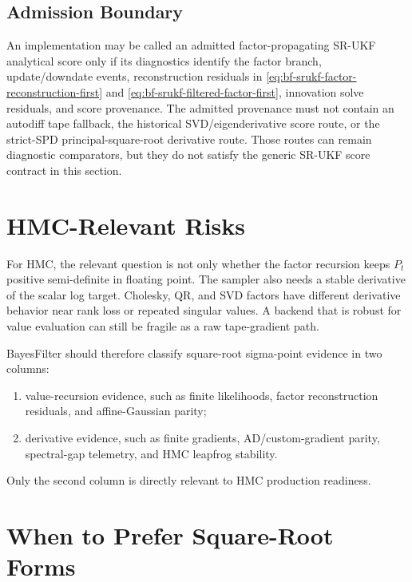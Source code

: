 \subsection{Admission Boundary}
\label{sec:bf-srukf-admission-boundary}

An implementation may be called an admitted factor-propagating SR-UKF analytical
score only if its diagnostics identify the factor branch, update/downdate
events, reconstruction residuals in
\eqref{eq:bf-srukf-factor-reconstruction-first} and
\eqref{eq:bf-srukf-filtered-factor-first}, innovation solve residuals, and
score provenance.  The admitted provenance must not contain an autodiff tape
fallback, the historical SVD/eigenderivative score route, or the strict-SPD
principal-square-root derivative route.  Those routes can remain diagnostic
comparators, but they do not satisfy the generic SR-UKF score contract in this
section.

\section{HMC-Relevant Risks}
\label{sec:bf-square-root-hmc-risks}

For HMC, the relevant question is not only whether the factor recursion keeps
$P_t$ positive semi-definite in floating point.  The sampler also needs a
stable derivative of the scalar log target.  Cholesky, QR, and SVD factors have
different derivative behavior near rank loss or repeated singular values.  A
backend that is robust for value evaluation can still be fragile as a raw
tape-gradient path.

BayesFilter should therefore classify square-root sigma-point evidence in two
columns:
\begin{enumerate}[label=(\roman*)]
  \item value-recursion evidence, such as finite likelihoods, factor
    reconstruction residuals, and affine-Gaussian parity;
  \item derivative evidence, such as finite gradients, AD/custom-gradient
    parity, spectral-gap telemetry, and HMC leapfrog stability.
\end{enumerate}
Only the second column is directly relevant to HMC production readiness.

\section{When to Prefer Square-Root Forms}
\label{sec:bf-square-root-choice}

